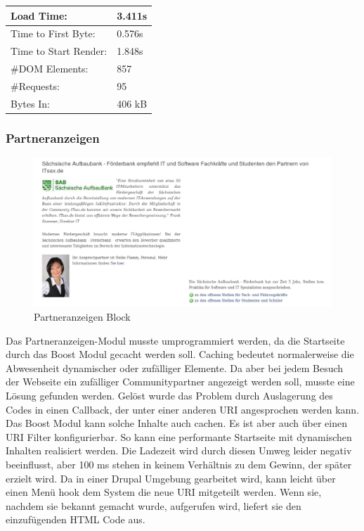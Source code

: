 \begin{table}
\caption{Ergebnis der Umprogrammierung des Facebook-Widgets}
    \begin{longtable}{ | p{3cm} | p{1.5cm} | }
    \hline
    Load Time: 			& 3.411s 	\\ \hline
    Time to First Byte:		& 0.576s  	\\ \hline
    Time to Start Render:	& 1.848s	\\ \hline
    \#DOM Elements:		& 857 		\\ \hline
    \#Requests:			& 95 		\\ \hline
    Bytes In:			& 406 kB 	\\ \hline
    \hline
    \end{longtable}
\end{table}


\subsubsection{Partneranzeigen}
\begin{figure}[!ht]
  \centering
  \includegraphics[width=1.1\textwidth]{material/partneranzeigen.png}
  \caption{Partneranzeigen Block}
  \label{fig:partneranzeigen}
\end{figure}
Das Partneranzeigen-Modul musste umprogrammiert werden, da die Startseite durch das Boost Modul gecacht werden soll. Caching bedeutet normalerweise die Abwesenheit dynamischer oder zufälliger Elemente. Da aber bei jedem Besuch der Webseite ein zufälliger Communitypartner angezeigt werden soll, musste eine Lösung gefunden werden. Gelöst wurde das Problem durch Auslagerung des Codes in einen Callback, der unter einer anderen URI angesprochen werden kann. Das Boost Modul kann solche Inhalte auch cachen. Es ist aber auch über einen URI Filter konfigurierbar. So kann eine performante Startseite mit dynamischen Inhalten realisiert werden. Die Ladezeit wird durch diesen Umweg leider negativ beeinflusst, aber 100 ms stehen in keinem Verhältnis zu dem Gewinn, der später erzielt wird. Da in einer Drupal Umgebung gearbeitet wird, kann leicht über einen Menü hook dem System die neue URI mitgeteilt werden. Wenn sie, nachdem sie bekannt gemacht wurde, aufgerufen wird, liefert sie den einzufügenden HTML Code aus.

